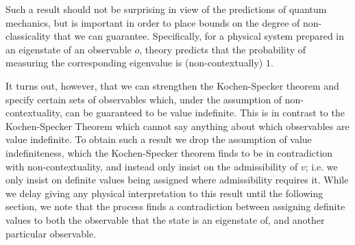 \documentclass[11pt, a4paper]{article}
\theoremstyle{definition}
\begin{document}
Such a result should not be surprising in view of the predictions of quantum mechanics, but is important in order to place bounds on the degree of non-classicality that we can guarantee. Specifically, for a physical system prepared in an eigenstate of an observable $o$, theory predicts that the probability of measuring the corresponding eigenvalue is (non-contextually) $1$.

It turns out, however, that we can strengthen the Kochen-Specker theorem and specify certain sets of observables which, under the assumption of non-contextuality, can be guaranteed to be value indefinite. This is in contrast to the Kochen-Specker Theorem which cannot say anything about which observables are value indefinite.
To obtain such a result we drop the assumption of value indefiniteness, which the Kochen-Specker theorem finds to be in contradiction with non-contextuality, and instead only insist on the admissibility of $v$; i.e. we only insist on definite values being assigned where admissibility requires it.
While we delay giving any physical interpretation to this result until the following section, we note that the process finds a contradiction between assigning definite values to both the observable that the state is an eigenstate of, and another particular observable. \\
\end{document}
